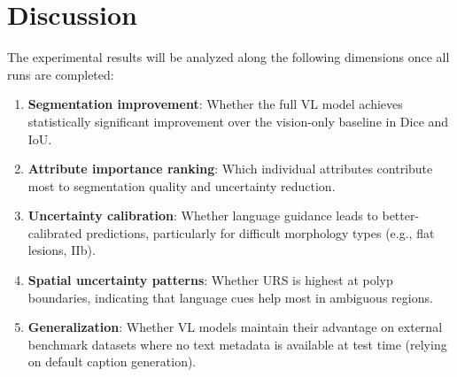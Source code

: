 \section{Discussion}
\label{sec:eval:discussion}

The experimental results will be analyzed along the following dimensions once all runs are completed:

\begin{enumerate}
	\item \textbf{Segmentation improvement}: Whether the full VL model achieves statistically significant improvement over the vision-only baseline in Dice and IoU.
	
	\item \textbf{Attribute importance ranking}: Which individual attributes contribute most to segmentation quality and uncertainty reduction.
	
	\item \textbf{Uncertainty calibration}: Whether language guidance leads to better-calibrated predictions, particularly for difficult morphology types (e.g., flat lesions, IIb).
	
	\item \textbf{Spatial uncertainty patterns}: Whether URS is highest at polyp boundaries, indicating that language cues help most in ambiguous regions.
	
	\item \textbf{Generalization}: Whether VL models maintain their advantage on external benchmark datasets where no text metadata is available at test time (relying on default caption generation).
\end{enumerate}

